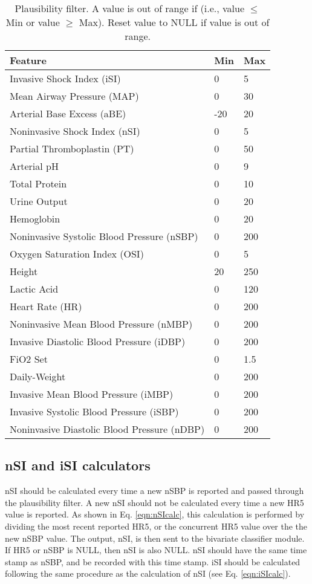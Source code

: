 \documentclass[
   technote
]{phildoc}
\newcommand{\ie}{i.e.,}
\newcommand{\eq}{Eq.}
\begin{document}
\begin{table}
\center
\caption{Plausibility filter. A value is out of range if (\ie{} value $\leq$ Min or value $\geq$ Max). Reset value to NULL if value is out of range.}
\label{tab:plausibility_filter}
\begin{tabular}{|l|l|l|}
	\hline
	\textbf{Feature} & \textbf{Min} & \textbf{Max} \\
	\hline
	\hline
	Invasive Shock Index (iSI) & 0 & 5 \\
	\hline
	Mean Airway Pressure (MAP) & 0 & 30 \\
	\hline
	Arterial Base Excess (aBE) & -20 & 20 \\
	\hline
	Noninvasive Shock Index (nSI) & 0 & 5 \\
	\hline
	Partial Thromboplastin (PT) & 0 & 50 \\
	\hline
	Arterial pH & 0 & 9 \\
	\hline
	Total Protein & 0 & 10 \\
	\hline
	Urine Output & 0 & 20 \\
	\hline
	Hemoglobin & 0 & 20 \\
	\hline
	Noninvasive Systolic Blood Pressure (nSBP) & 0 & 200 \\
	\hline
	Oxygen Saturation Index (OSI) & 0 & 5\\
	\hline
	Height & 20 & 250 \\
	\hline
	Lactic Acid & 0 & 120 \\
	\hline
	Heart Rate (HR) & 0 & 200 \\
	\hline
	Noninvasive Mean Blood Pressure (nMBP) & 0 & 200 \\
	\hline
	Invasive Diastolic Blood Pressure (iDBP) & 0 & 200 \\
	\hline
	FiO2 Set & 0 & 1.5\\
	\hline
	Daily-Weight & 0 & 200 \\
	\hline
	Invasive Mean Blood Pressure (iMBP) & 0 & 200 \\
	\hline
	Invasive Systolic Blood Pressure (iSBP) & 0 & 200 \\
	\hline
	Noninvasive Diastolic Blood Pressure (nDBP) & 0 & 200 \\
	\hline
\end{tabular}
\end{table}

\subsection{nSI and iSI calculators}
nSI should be calculated every time a new nSBP is reported and passed through the plausibility filter. A new nSI should not be calculated every time a new HR5 value is reported. As shown in \eq{} \ref{eqn:nSIcalc}, this calculation is performed by dividing the most recent reported HR5, or the concurrent HR5 value over the the new nSBP value. The output, nSI, is then sent to the bivariate classifier module. If HR5 or nSBP is NULL, then nSI is also NULL. nSI should have the same time stamp as nSBP, and be recorded with this time stamp. iSI should be calculated following the same procedure as the calculation of nSI (see \eq{} \ref{eqn:iSIcalc}).
\end{document}

